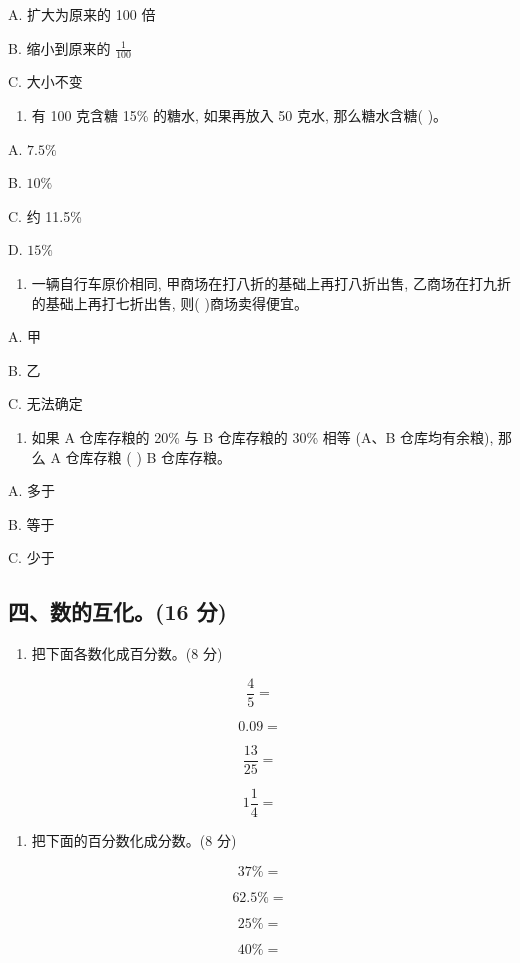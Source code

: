 \documentclass[
  10
]{article}
\providecommand{\tightlist}{%
  \setlength{\itemsep}{0pt}\setlength{\parskip}{0pt}}
\begin{document}
A. 扩大为原来的 100 倍

B. 缩小到原来的 \(\frac{1}{100}\)

C. 大小不变

\begin{enumerate}
\def\labelenumi{\arabic{enumi}.}
\setcounter{enumi}{2}
\tightlist
\item
  有 100 克含糖 15\% 的糖水, 如果再放入 50 克水, 那么糖水含糖( )。
\end{enumerate}

A. \(7.5\%\)

B. \(10\%\)

C. 约 11.5\%

D. \(15\%\)

\begin{enumerate}
\def\labelenumi{\arabic{enumi}.}
\setcounter{enumi}{3}
\tightlist
\item
  一辆自行车原价相同, 甲商场在打八折的基础上再打八折出售,
  乙商场在打九折的基础上再打七折出售, 则( )商场卖得便宜。
\end{enumerate}

A. 甲

B. 乙

C. 无法确定

\begin{enumerate}
\def\labelenumi{\arabic{enumi}.}
\setcounter{enumi}{4}
\tightlist
\item
  如果 A 仓库存粮的 20\% 与 B 仓库存粮的 30\% 相等 (A、B 仓库均有余粮),
  那么 A 仓库存粮 ( ) B 仓库存粮。
\end{enumerate}

A. 多于

B. 等于

C. 少于

\subsection{四、数的互化。(16
分)}\label{ux56dbux6570ux7684ux4e92ux531616-ux5206}

\begin{enumerate}
\def\labelenumi{\arabic{enumi}.}
\tightlist
\item
  把下面各数化成百分数。(8 分)
\end{enumerate}

\[
\frac {4}{5} =
\]

\[
0. 0 9 =
\]

\[
\frac {1 3}{2 5} =
\]

\[
1 \frac {1}{4} =
\]

\begin{enumerate}
\def\labelenumi{\arabic{enumi}.}
\setcounter{enumi}{1}
\tightlist
\item
  把下面的百分数化成分数。(8 分)
\end{enumerate}

\[
37 \% =
\]

\[
62.5 \% =
\]

\[
25 \% =
\]

\[
40 \% =
\]
\end{document}
